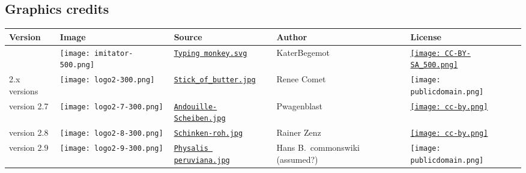 \subsection*{Graphics credits}

\newcommand{\ccbythree}{\href{https://creativecommons.org/licenses/by/3.0/}{\texttt{[image: cc-by.png]}}}
\newcommand{\ccbysathree}{\href{https://creativecommons.org/licenses/by-sa/3.0/}{\texttt{[image: CC-BY-SA\_500.png]}}}
\newcommand{\cczero}{\href{https://creativecommons.org/publicdomain/zero/1.0/}{\texttt{[image: cc-zero.png]}}}
\newcommand{\publicdomain}{\texttt{[image: publicdomain.png]}}

\begin{tabular}{| l | l | p{3.5cm} | p{3cm} | l |}
	\hline
	\textbf{Version} & \textbf{Image} & \textbf{Source} & \textbf{Author} & \textbf{License}
	\\\hline
	\imitator{} & \texttt{[image: imitator-500.png]} & \href{https://commons.wikimedia.org/wiki/File:Typing_monkey.svg}{\nolinkurl{Typing monkey.svg}} & KaterBegemot & \ccbysathree{}
	\\\hline
	2.x versions & \texttt{[image: logo2-300.png]} & \href{https://commons.wikimedia.org/wiki/File:Stick_of_butter.jpg}{\nolinkurl{Stick_of_butter.jpg}} & Renee Comet & \publicdomain{}
	\\\hline
	version 2.7 & \texttt{[image: logo2-7-300.png]} & \href{https://commons.wikimedia.org/wiki/File:Andouille-Scheiben.jpg}{\nolinkurl{Andouille-Scheiben.jpg}} & Pwagenblast & \ccbythree{}
	\\\hline
	version 2.8 & \texttt{[image: logo2-8-300.png]} & \href{https://commons.wikimedia.org/wiki/File:Schinken-roh.jpg}{\nolinkurl{Schinken-roh.jpg}} & Rainer Zenz & \ccbythree{}
	\\\hline
	version 2.9 & \texttt{[image: logo2-9-300.png]} & \href{https://commons.wikimedia.org/wiki/File:Physalis_peruviana.jpg}{\nolinkurl{Physalis peruviana.jpg}} & Hans B.~commonswiki (assumed?) & \publicdomain{}

\end{tabular}
